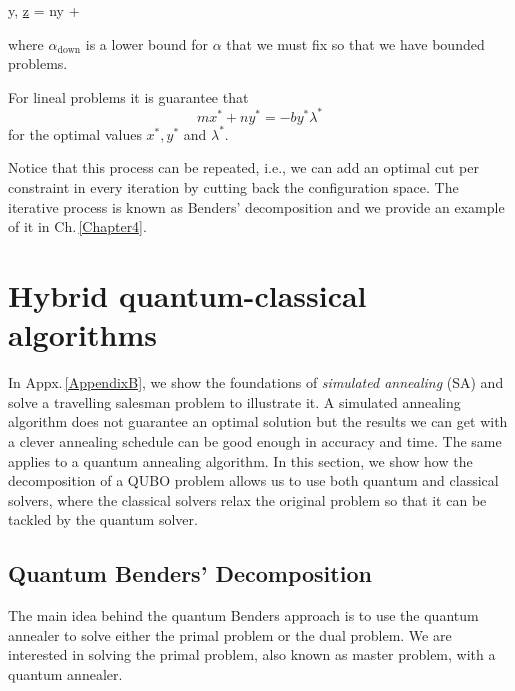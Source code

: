 \begin{tcolorbox}[colback=blue!5!white,colframe=blue!75!black,title=Master problem]
\begin{mini!}[2]
	{y, \alpha}{\underline{z} = ny + \alpha}{}{}{}
\end{mini!}
\end{tcolorbox}
where $\alpha_{\text{down}}$ is a lower bound for $\alpha$ that we must fix so that we have bounded problems.
\begin{tcolorbox}[colback=black!5!white,colframe=black!75!black,title=Strong Duality condition]
For lineal problems it is guarantee that
\begin{equation}
    mx^{*} + ny^{*} =-by^{*}\lambda^{*}
\end{equation}
for the optimal values $x^{*},y^{*}$ and $\lambda^{*}$.
\end{tcolorbox}
 Notice that this process can be repeated, i.e., we can add an optimal cut per constraint in every iteration by cutting back the configuration space. The iterative process is known as Benders' decomposition and we provide an example of it in Ch.\,\ref{Chapter4}.

\section{Hybrid quantum-classical algorithms}
In Appx.\,\ref{AppendixB}, we show the foundations of \textit{simulated annealing} (SA) and solve a travelling salesman problem to illustrate it. A simulated annealing algorithm does not guarantee an optimal solution but the results we can get with a clever annealing schedule can be good enough in accuracy and time. The same applies to a quantum annealing algorithm. In this section, we show how the decomposition of a QUBO problem allows us to use both quantum and classical solvers, where the classical solvers relax the original problem so that it can be tackled by the quantum solver.
\subsection{Quantum Benders' Decomposition}
The main idea behind the quantum Benders approach is to use the quantum annealer to solve either the primal problem or the dual problem. We are interested in solving the primal problem, also known as master problem, with a quantum annealer. 
